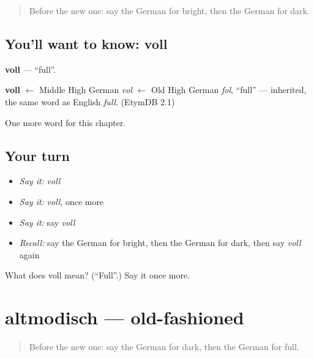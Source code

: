 \label{lesson:GE-C168-voll}



\begin{quote}
Before the new one: say the German for bright, then the German for dark.
\end{quote}

\subsection*{You'll want to know: voll}
\textbf{voll} — \textquotedblleft{}full\textquotedblright{}.

\begin{cousinweb}
\textbf{voll} $\leftarrow$ Middle High German \emph{vol} $\leftarrow$ Old High German \emph{fol}, \textquotedblleft{}full\textquotedblright{} — inherited, the same word as English \emph{full}. (EtymDB 2.1)
\end{cousinweb}

\begin{grammarlens}[title={What you've built}]
One more word for this chapter.
\end{grammarlens}

\subsection*{Your turn}
\begin{itemize}
\raggedright
  \item \emph{Say it:} \emph{voll}
  \item \emph{Say it:} \emph{voll}, once more
  \item \emph{Say it:} say \emph{voll}
  \item \emph{Recall:} say the German for bright, then the German for dark, then say \emph{voll} again
\end{itemize}

\begin{tcolorbox}[breakable,colback=teal!4,colframe=teal!35!black,title={Before you move on}]
What does voll mean? (\textquotedblleft{}Full\textquotedblright{}.) Say it once more.
\end{tcolorbox}
\section[altmodisch]{altmodisch — old-fashioned}

\label{lesson:GE-C168-altmodisch}



\begin{quote}
Before the new one: say the German for dark, then the German for full.
\end{quote}

